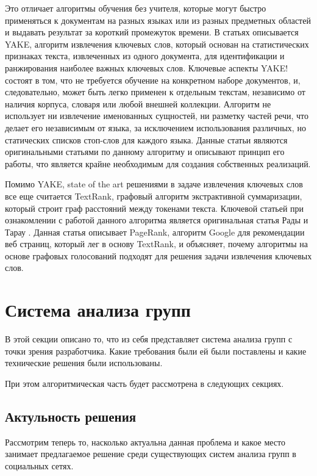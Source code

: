 \documentclass[14pt]{matmex-diploma-custom}
\begin{document}
Это отличает алгоритмы обучения без учителя, которые могут быстро применяться к документам на разных языках или из разных предметных областей и выдавать результат за короткий промежуток времени. В статьях \cite{yake1, yake2} описывается YAKE, алгоритм извлечения ключевых слов, который основан на статистических признаках текста, извлеченных из одного документа, для идентификации и ранжирования наиболее важных ключевых слов. Ключевые аспекты YAKE! состоят в том, что не требуется обучение на конкретном наборе документов, и, следовательно, может быть легко применен к отдельным текстам, независимо от наличия корпуса, словаря или любой внешней коллекции. Алгоритм не использует ни извлечение именованных сущностей, ни разметку частей речи, что делает его независимым от языка, за исключением использования различных, но статических списков стоп-слов для каждого языка. Данные статьи являются оригинальными статьями по данному алгоритму и описывают принцип его работы, что является крайне необходимым для создания собственных реализаций.

Помимо YAKE, state of the art решениями в задаче извлечения ключевых слов все еще считается TextRank, графовый алгоритм экстрактивной суммаризации, который строит граф расстояний между токенами текста. Ключевой статьей при ознакомлении с работой данного алгоритма является оригинальная статья Рады и Тарау \cite{TextrankOriginal}. Данная статья описывает PageRank, алгоритм Google для рекомендации веб страниц, который лег в основу TextRank, и объясняет, почему алгоритмы на основе графовых голосований подходят для решения задачи извлечения ключевых слов.

\section{Система анализа групп}

В этой секции описано то, что из себя представляет система анализа групп с точки зрения разработчика.
Какие требования были ей были поставлены и какие технические решения были использованы.

При этом алгоритмическая часть будет рассмотрена в следующих секциях.

\subsection{Актульность решения}
Рассмотрим теперь то, насколько актуальна данная проблема 
и какое место занимает предлагаемое решение среди существующих систем анализа
групп в социальных сетях.
\end{document}
